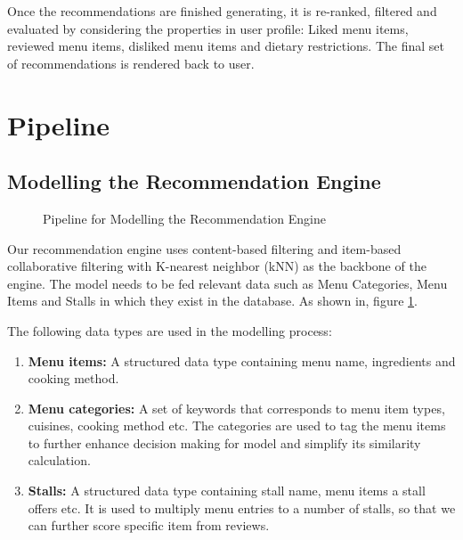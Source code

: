 Once the recommendations are finished generating, it is re-ranked, filtered and evaluated by considering the properties in user profile: Liked menu items, reviewed menu items, disliked menu items and dietary restrictions. The final set of recommendations is rendered back to user.


\newpage

\section{Pipeline}
\label{section:pipeline}

\subsection{Modelling the Recommendation Engine}
\begin{figure}[h!]
    \centering
    
    \caption{Pipeline for Modelling the Recommendation Engine}
    \label{fig:pipeline-for-modelling}
\end{figure}

Our recommendation engine uses content-based filtering and item-based collaborative filtering
with K-nearest neighbor (kNN) as the backbone of the engine. \cite{singhanddwivedi:2023}
The model needs to be fed relevant data such as Menu Categories, Menu Items and Stalls in which they exist in
the database. As shown in, figure \ref{fig:pipeline-for-modelling}.

The following data types are used in the modelling process:

\begin{enumerate}[leftmargin=80pt]
    \item \textbf{Menu items:} A structured data type containing menu name, ingredients and cooking method.
    \item \textbf{Menu categories:} A set of keywords that corresponds to menu item types, cuisines, cooking method etc.
    The categories are used to tag the menu items to further enhance decision making for model and simplify its
    similarity calculation.
    \item \textbf{Stalls:} A structured data type containing stall name, menu items a stall offers etc.
    It is used to multiply menu entries to a number of stalls, so that we can further score specific item from reviews.
\end{enumerate}

